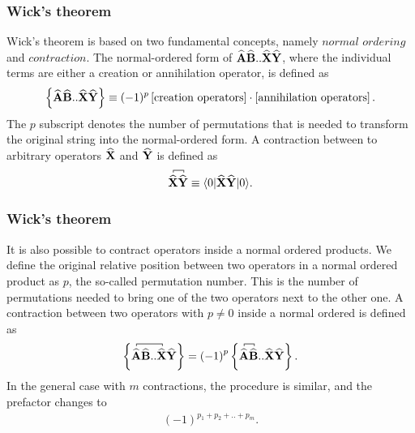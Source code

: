\documentclass{beamer}
\newcommand*{\for}[3]{\langle#1|#2|#3\rangle}
\newcommand*{\kpr}[1]{\left\{#1\right\}}
\newcommand{\OP}[1]{{\bf\widehat{#1}}}
\newcommand*{\fpr}[1]{\left[#1\right]}
\newcommand*{\pr}[1]{\left(#1\right)}
\begin{document}





\frame
{
  \frametitle{Wick's theorem}
\begin{small}
{\scriptsize
Wick's theorem is based on two fundamental concepts, namely $\textit{normal ordering}$ and $\textit{contraction}$. The normal-ordered form of $\OP{A}\OP{B}..\OP{X}\OP{Y}$, where the individual terms are either a creation or annihilation operator, is defined as
\begin{align}
\label{def: Normal ordering}
\kpr{\OP{A}\OP{B}..\OP{X}\OP{Y}} \equiv (-1)^p\fpr{\text{creation operators}}\cdot\fpr{\text{annihilation operators}}.
\end{align}
The $p$ subscript denotes the number of permutations that is needed to transform the original string into the normal-ordered form. A contraction between to arbitrary operators $\OP{X}$ and $\OP{Y}$ is defined as  
\begin{align}
\contraction[0.5ex]{}{\OP{X}}{}{\OP{Y}}{} 
\OP{X}\OP{Y}  \equiv \for{0}{\OP{X}\OP{Y}}{0}.
\end{align}
}
\end{small}
}

\frame
{
  \frametitle{Wick's theorem}
\begin{small}
{\scriptsize
It is also possible to contract operators inside a normal ordered products. We define the  original relative position between two operators in a normal ordered product as $p$, the so-called permutation number. This is the number of permutations needed to bring one of the two operators next to the other one. A contraction between two operators with $p \neq 0$ inside a normal ordered is defined as
\begin{align}
\kpr{\contraction[0.5ex]{}{\OP{A}}{\OP{B}..}{\OP{X}}\OP{A}\OP{B}..\OP{X}\OP{Y}} = \pr{-1}^p \kpr{\contraction[0.5ex]{}{\OP{A}}{}{\OP{B}}\OP{A}\OP{B}..\OP{X}\OP{Y}}.
\end{align}
In the general case with $m$ contractions, the procedure is similar, and the prefactor changes to 
\begin{align}
\pr{-1}^{p_1 + p_2 + .. + p_m}.
\end{align} 
}
\end{small}
}
\end{document}
